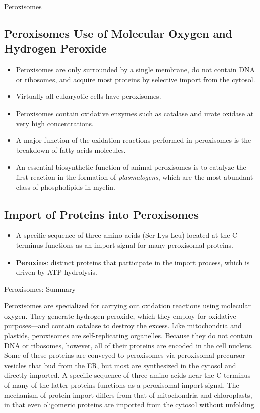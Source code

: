 \documentclass[12pt,letterpaper]{article}
\begin{document}
\hypertarget{12.4}{}
\begin{secbox}{\hyperlink{12}{Peroxisomes}}{
    \hypertarget{12.4.1}{\subsection*{Peroxisomes Use of Molecular Oxygen and Hydrogen Peroxide}}
    \begin{itemize}
        \item Peroxisomes are only surrounded by a single membrane, do not contain DNA or ribosomes, and acquire most proteins by selective import from the cytosol.
        \item Virtually all eukaryotic cells have peroxisomes.
        \item Peroxisomes contain oxidative enzymes such as catalase and urate oxidase at very high concentrations.
        \item A major function of the oxidation reactions performed in peroxisomes is the breakdown of fatty acids molecules.
        \item An essential biosynthetic function of animal peroxisomes is to catalyze the first reaction in the formation of \textit{plasmalogens}, which are the most abundant class of phospholipids in myelin.
    \end{itemize}

    \hypertarget{12.4.2}{\subsection*{Import of Proteins into Peroxisomes}}
    \begin{itemize}
        \item A specific sequence of three amino acids (Ser-Lys-Leu) located at the C-terminus functions as an import signal for many peroxisomal proteins.
        \item \textbf{Peroxins}: distinct proteins that participate in the import process, which is driven by ATP hydrolysis.
    \end{itemize}

    \hypertarget{12.4.r}{}
    \begin{probbox}{Peroxisomes: Summary}\end{probbox}
    Peroxisomes are specialized for carrying out oxidation reactions using molecular oxygen. They generate hydrogen peroxide, which they employ for oxidative purposes—and contain catalase to destroy the excess. Like mitochondria and plastids, peroxisomes are self-replicating organelles. Because they do not contain DNA or ribosomes, however, all of their proteins are encoded in the cell nucleus. Some of these proteins are conveyed to peroxisomes via peroxisomal precursor vesicles that bud from the ER, but most are synthesized in the cytosol and directly imported. A specific sequence of three amino acids near the C-terminus of many of the latter proteins functions as a peroxisomal import signal. The mechanism of protein import differs from that of mitochondria and chloroplasts, in that even oligomeric proteins are imported from the cytosol without unfolding.
}\end{secbox}
\end{document}
